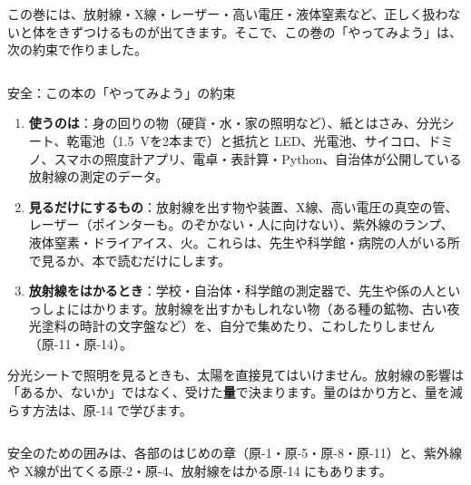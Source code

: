 \leavevmode\label{ph:原-0:sec7}この巻には、放射線・X線・レーザー・高い電圧・液体窒素など、正しく扱わないと体をきずつけるものが出てきます。そこで、この巻の「やってみよう」は、次の約束で作りました。
\begin{column}{安全：この本の「やってみよう」の約束}
\begin{enumerate}[label={\bkcircled{\arabic*}}, leftmargin=2.4\zw, itemsep=0pt, topsep=2pt]
\item \textbf{使うのは}：身の回りの物（硬貨・水・家の照明など）、紙とはさみ、分光シート、乾電池（\qty{1.5}{V}を2本まで）と抵抗と LED、光電池、サイコロ、ドミノ、スマホの照度計アプリ、電卓・表計算・Python、自治体が公開している放射線の測定のデータ。
\item \textbf{見るだけにするもの}：放射線を出す物や装置、X線、高い電圧の真空の管、レーザー（ポインターも。のぞかない・人に向けない）、紫外線のランプ、液体窒素・ドライアイス、火。これらは、先生や科学館・病院の人がいる所で見るか、本で読むだけにします。
\item \textbf{放射線をはかるとき}：学校・自治体・科学館の測定器で、先生や係の人といっしょにはかります。放射線を出すかもしれない物（ある種の鉱物、古い夜光塗料の時計の文字盤など）を、自分で集めたり、こわしたりしません（原-11・原-14）。
\end{enumerate}
分光シートで照明を見るときも、太陽を直接見てはいけません。放射線の影響は「あるか、ないか」ではなく、受けた\textbf{量}で決まります。量のはかり方と、量を減らす方法は、原-14 で学びます。
\end{column}
\noindent 安全のための囲みは、各部のはじめの章（原-1・原-5・原-8・原-11）と、紫外線や X線が出てくる原-2・原-4、放射線をはかる原-14 にもあります。

